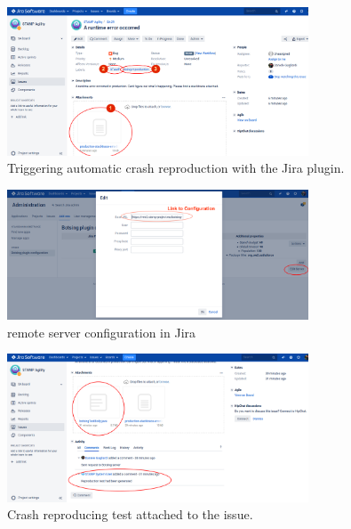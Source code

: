 \begin{figure}
    \includegraphics[width=0.8\textwidth]{conclusion/figures/deliverables_wp4_d44_images_jira-doing-reproduction.png}
    \caption{Triggering automatic crash reproduction with the \botsing Jira plugin.}
    \label{fig:conclusion:botsingJira1}
\end{figure}

\begin{figure}
    \includegraphics[width=0.8\textwidth]{conclusion/figures/deliverables_wp4_d44_images_jira-botsing-server-configuration.png}
    \caption{\botsing remote server configuration in Jira}
    \label{fig:conclusion:botsingJira2}
\end{figure}


\begin{figure}
    \includegraphics[width=0.8\textwidth]{conclusion/figures/deliverables_wp4_d44_images_jira-reproduction-done.png}
    \caption{Crash reproducing test attached to the issue.}
    \label{fig:conclusion:botsingJira3}
\end{figure}


